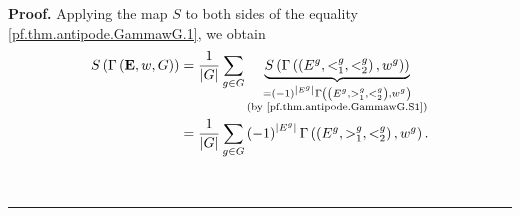 \documentclass[numbers=enddot,12pt,final,onecolumn,notitlepage,abstracton]{scrartcl}%
\theoremstyle{definition}
\newenvironment{proof}[1][Proof]{\noindent\textbf{#1.} }{\ \rule{0.5em}{0.5em}}
\let\sumnonlimits\sum
\renewcommand{\sum}{\sumnonlimits\limits}
\newcommand{\EE}{{\mathbf{E}}}
\begin{document}
\begin{proof}
Applying the map $S$ to both sides of the equality
\eqref{pf.thm.antipode.GammawG.1}, we obtain
\begin{align}
S\left(  \Gamma\left(  { \EE },w,G\right)  \right)
& = \dfrac{1}{
\left\vert G\right\vert }\sum_{g\in G}\underbrace{S\left(  \Gamma\left(
\left(  E^{g},<_{1}^{g},<_{2}^{g}\right)  ,w^{g}\right)  \right)
}_{\substack{=\left(  -1\right)  ^{\left\vert E^{g}\right\vert }\Gamma\left(
\left(  E^{g},>_{1}^{g},<_{2}^{g}\right)  ,w^{g}\right)  \\\text{(by
\eqref{pf.thm.antipode.GammawG.S1})}}}\nonumber\\
& =\dfrac{1}{\left\vert G\right\vert }\sum_{g\in G}\left(  -1\right)
^{\left\vert E^{g}\right\vert }
\Gamma\left(  \left(  E^{g},>_{1}^{g},<_{2}^{g}\right)  ,w^{g}\right)
.
\label{pf.thm.antipode.GammawG.1S}
\end{align}



\end{proof}
\end{document}
